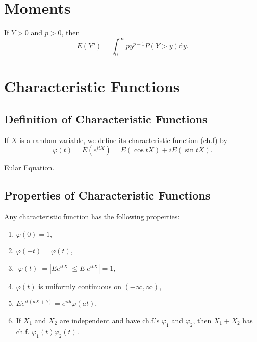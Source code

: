 \section{Moments}

\begin{lemma}
	If $Y>0$ and $p>0$, then
	\begin{equation}
		E(Y^p)=\int_{0}^{\infty}py^{p-1}P(Y>y)\mathrm{d}y.
	\end{equation}
\end{lemma}

\section{Characteristic Functions}

\subsection{Definition of Characteristic Functions}

\begin{definition} \label{def:characteristic-function}
	If $X$ is a random variable, we define its characteristic function (ch.f) by
	\begin{equation}
		\varphi(t)=E\left(e^{itX}\right)=E\left(\cos tX\right)+i E\left(\sin tX\right).
	\end{equation}
\end{definition}

\begin{remark}
	Eular Equation.
\end{remark}

\subsection{Properties of Characteristic Functions}

\begin{theorem} \label{thm:characteristic-function-property}
	Any characteristic function has the following properties:
	\begin{enumerate}
		\item $\varphi(0) = 1$,
		\item $\varphi(-t) = \overline{\varphi(t)}$,
		\item $|\varphi(t)| =|Ee^{itX}| \leq E|e^{itX}| = 1$,
		\item $\varphi(t)$ is uniformly continuous on $(-\infty,\infty)$,
		\item $Ee^{it(aX+b)}=e^{itb}\varphi(at)$,
		\item  If $X_1$ and $X_2$ are independent and have ch.f.'s $\varphi_1$ and $\varphi_2$, then $X_1+X_2$ has ch.f. $\varphi_1(t)\varphi_2(t)$.
	\end{enumerate}
\end{theorem}


